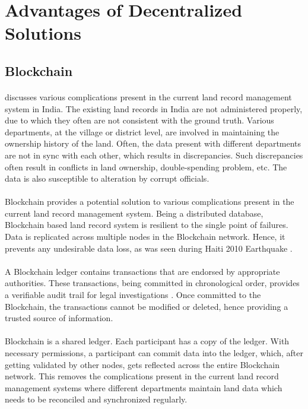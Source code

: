 \documentclass{article}
\begin{document}
\section{Advantages of Decentralized Solutions}

    \subsection{Blockchain}
        \paragraph{}
        \cite{THAKUR2020101940} discusses various complications present in the current land record management system in India. The existing land records in India are not administered properly, due to which they often are not consistent with the ground truth. Various departments, at the village or district level, are involved in maintaining the ownership history of the land. Often, the data present with different departments are not in sync with each other, which results in discrepancies. Such discrepancies often result in conflicts in land ownership, double-spending problem, etc. The data is also susceptible to alteration by corrupt officials.

        \paragraph{}
        Blockchain provides a potential solution to various complications present in the current land record management system. Being a distributed database, Blockchain based land record system is resilient to the single point of failures. Data is replicated across multiple nodes in the Blockchain network. Hence, it prevents any undesirable data loss, as was seen during Haiti 2010 Earthquake \cite{haiti}.
        
        \paragraph{}
        A Blockchain ledger contains transactions that are endorsed by appropriate authorities. These transactions, being committed in chronological order, provides a verifiable audit trail for legal investigations \cite{Sahlin2018BlockchainIA}. Once committed to the Blockchain, the transactions cannot be modified or deleted, hence providing a trusted source of information.

        \paragraph{}
        Blockchain is a shared ledger. Each participant has a copy of the ledger. With necessary permissions, a participant can commit data into the ledger, which, after getting validated by other nodes, gets reflected across the entire Blockchain network. This removes the complications present in the current land record management systems where different departments maintain land data which needs to be reconciled and synchronized regularly.
    
\end{document}
